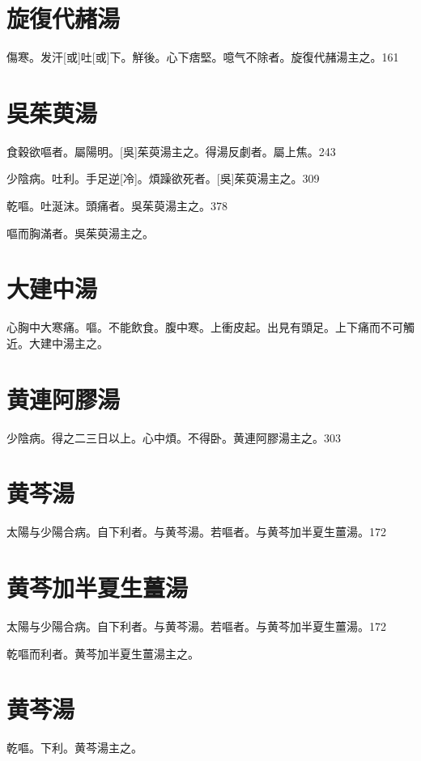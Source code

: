 \documentclass[12pt,twoside,UTF8,b5paper]{ctexbook}
\begin{document}
\section{旋復代赭湯}

傷寒。发汗[或]吐[或]下。觧後。心下痞堅。噫气不除者。旋復代赭湯主之。161

\section{吳茱萸湯}

食穀欲嘔者。屬陽明。[吳]茱萸湯主之。得湯反劇者。屬上焦。243

少陰病。吐利。手足逆[冷]。煩躁欲死者。[吳]茱萸湯主之。309

乾嘔。吐涎沫。頭痛者。吳茱萸湯主之。378

嘔而胸滿者。吳茱萸湯主之。

\section{大建中湯}

心胸中大寒痛。嘔。不能飲食。腹中寒。上衝皮起。出見有頭足。上下痛而不可觸近。大建中湯主之。

\section{黄連阿膠湯}

少陰病。得之二三日以上。心中煩。不得卧。黄連阿膠湯主之。303

\section{黄芩湯}

太陽与少陽合病。自下利者。与黄芩湯。若嘔者。与黄芩加半夏生薑湯。172

\section{黄芩加半夏生薑湯}

太陽与少陽合病。自下利者。与黄芩湯。若嘔者。与黄芩加半夏生薑湯。172

乾嘔而利者。黄芩加半夏生薑湯主之。

\section{黄芩湯}

乾嘔。下利。黄芩湯主之。
\end{document}
